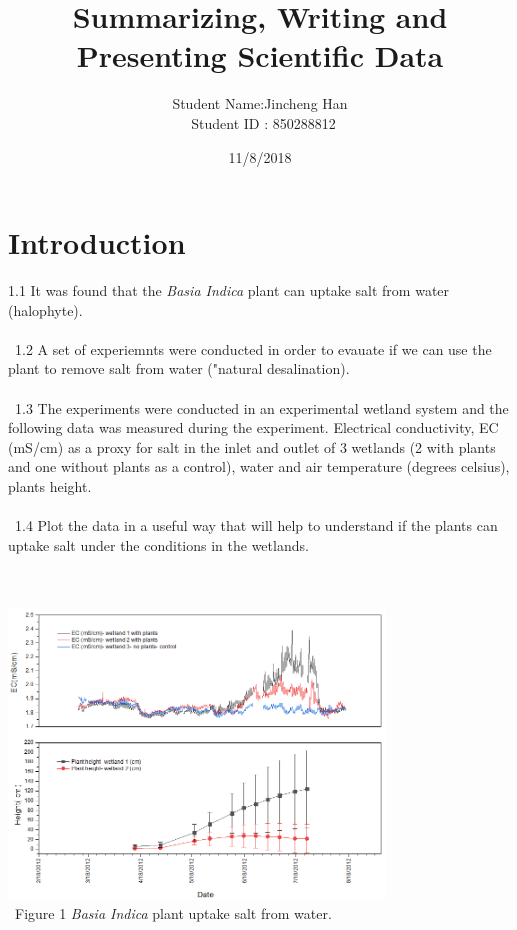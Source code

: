 \documentclass[a4paper]{article}
\title{Summarizing, Writing and Presenting Scientific Data}
\author{Student Name:Jincheng Han \\\ 
 Student ID : 850288812}
\date{11/8/2018}
\begin{document}
\maketitle

\section{Introduction}

1.1 It was found that the \textit{Basia Indica} plant can uptake salt from water (halophyte).\\\
\\\
1.2 A set of experiemnts were conducted in order to evauate if we can use the plant to remove salt from water ("natural desalination).\\\
\\\
1.3 The experiments were conducted in an experimental wetland system and the following data was measured during the experiment. Electrical conductivity, EC (mS/cm) as a proxy for salt in the inlet and outlet of 3 wetlands (2 with plants and one without plants as a control), water and air temperature (degrees celsius), plants height.\\\
\\\
1.4 Plot the data in a useful way that will help to understand if the plants can uptake salt under the conditions in the wetlands.\\\
\\\

\includegraphics[width=10cm]{微信图片_20181108114817}
\centering \\\
Figure 1 \textit{Basia Indica} plant uptake salt from water. 
\end{document}
